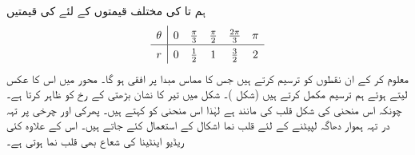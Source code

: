 ہم  تا  کی مختلف قیمتوں کے لئے   کی قیمتیں
\begin{align*}
\renewcommand{\arraystretch}{1.4}
\begin{array}{c|ccccc}
\theta&0&\tfrac{\pi}{3}&\tfrac{\pi}{2}&\tfrac{2\pi}{3}&\pi\\
\hline
r&0&\tfrac{1}{2}&1&\tfrac{3}{2}&2
\end{array}
\end{align*}
 معلوم کر کے ان نقطوں کو ترسیم کرتے ہیں جس کا مماس مبدا پر افقی ہو گا۔ محور  میں اس کا عکس لیتے ہوئے ہم ترسیم مکمل کرتے ہیں (شکل )۔ شکل  میں تیر کا نشان بڑھتی  کے رخ کو ظاہر کرتا ہے۔ چونکہ اس منحنی کی شکل قلب کی مانند ہے لہٰذا اس منحنی کو  کہتے ہیں۔ پھرکی اور چرخی پر تہہ در تہہ ہموار دھاگہ لپیٹنے کے لئے  قلب نما اشکال کے  استعمال کئے جاتے ہیں۔ اس کے علاوہ کئی ریڈیو اینٹینا کی شعاع بھی قلب نما ہوتی ہے۔ 
